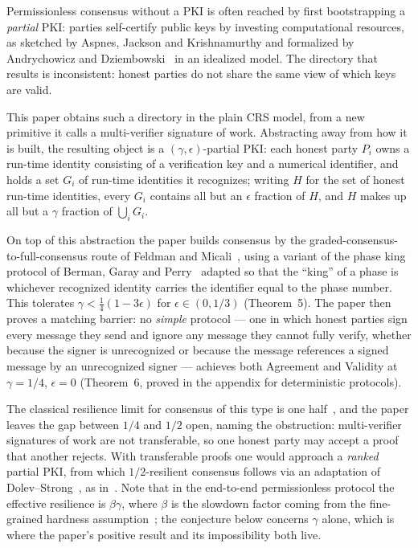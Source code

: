 \documentclass{aicr-conjecture}
\begin{document}
Permissionless consensus without a PKI is often reached by first
bootstrapping a \emph{partial} PKI: parties self-certify public keys by
investing computational resources, as sketched by Aspnes, Jackson and
Krishnamurthy and formalized by Andrychowicz and
Dziembowski~\cite{AD15} in an idealized model. The directory that
results is inconsistent: honest parties do not share the same view of
which keys are valid.

This paper obtains such a directory in the plain CRS model, from a new
primitive it calls a multi-verifier signature of work. Abstracting away
from how it is built, the resulting object is a
$(\gamma,\epsilon)$-partial PKI: each honest party $P_i$ owns a run-time
identity consisting of a verification key and a numerical identifier,
and holds a set $G_i$ of run-time identities it recognizes; writing $H$
for the set of honest run-time identities, every $G_i$ contains all but
an $\epsilon$ fraction of $H$, and $H$ makes up all but a $\gamma$
fraction of $\bigcup_i G_i$.

On top of this abstraction the paper builds consensus by the
graded-consensus-to-full-consensus route of Feldman and
Micali~\cite{FM97}, using a variant of the phase king protocol of
Berman, Garay and Perry~\cite{BGP89} adapted so that the ``king'' of a
phase is whichever recognized identity carries the identifier equal to
the phase number. This tolerates $\gamma < \frac{1}{4}(1-3\epsilon)$ for
$\epsilon \in (0,1/3)$ (Theorem~5). The paper then proves a matching
barrier: no \emph{simple} protocol --- one in which honest parties sign
every message they send and ignore any message they cannot fully verify,
whether because the signer is unrecognized or because the message
references a signed message by an unrecognized signer --- achieves both
Agreement and Validity at $\gamma = 1/4$, $\epsilon = 0$ (Theorem~6,
proved in the appendix for deterministic protocols).

The classical resilience limit for consensus of this type is one
half~\cite{Fit02}, and the paper leaves the gap between $1/4$ and $1/2$
open, naming the obstruction: multi-verifier signatures of work are not
transferable, so one honest party may accept a proof that another
rejects. With transferable proofs one would approach a \emph{ranked}
partial PKI, from which $1/2$-resilient consensus follows via an
adaptation of Dolev--Strong~\cite{DS83}, as in~\cite{AD15}. Note that in
the end-to-end permissionless protocol the effective resilience is
$\beta\gamma$, where $\beta$ is the slowdown factor coming from the
fine-grained hardness assumption~\cite{BGH24a}; the conjecture below
concerns $\gamma$ alone, which is where the paper's positive result and
its impossibility both live.
\end{document}
